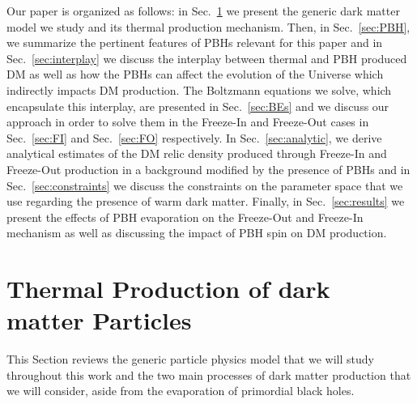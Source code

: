 \documentclass[aps,prd,reprint,twocolumn,preprintnumbers,floatfix,nofootinbib]{revtex4-1}
\newcommand{\secref}[1]{Sec.~\ref{#1}}
\begin{document}
Our paper is organized as follows: in \secref{sec:model} we present the generic dark matter model we study and its thermal production mechanism. Then, in \secref{sec:PBH},  we summarize the pertinent features of PBHs relevant for this paper and in \secref{sec:interplay} we discuss the interplay between thermal and PBH produced DM as well as how the PBHs can affect the evolution of the Universe which indirectly impacts DM production. The Boltzmann equations we solve, which encapsulate this interplay, are presented in \secref{sec:BEs} and we discuss our approach in order to solve them in the Freeze-In and Freeze-Out cases in \secref{sec:FI} and \secref{sec:FO} respectively. In \secref{sec:analytic},  we derive analytical estimates of the DM relic density produced through Freeze-In and Freeze-Out production in a background modified by the presence of PBHs and in \secref{sec:constraints} we discuss the constraints on the parameter space that we use regarding the presence of warm dark matter.  Finally, in \secref{sec:results} we present the effects of PBH evaporation on the Freeze-Out and Freeze-In mechanism as well as discussing the impact of PBH spin on DM production. 

\section{Thermal Production of dark matter Particles}\label{sec:model}

This Section reviews the generic particle physics model that we will study throughout this work and the two main processes of dark matter production that we will consider, aside from the evaporation of primordial black holes.
\end{document}
